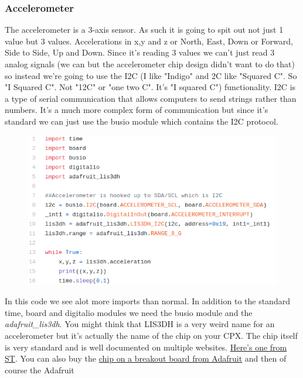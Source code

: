 {\subsubsection{Accelerometer}
\label{s:modules}
The accelerometer is a 3-axis sensor. As such it is going to spit out
not just 1 value but 3 values. Accelerations in x,y and z or North,
East, Down or Forward, Side to Side, Up and Down. Since it’s reading 3
values we can’t just read 3 analog signals (we can but the
accelerometer chip design didn’t want to do that) so instead we’re
going to use the I2C (I like "Indigo" and 2C like "Squared C". So "I Squared C". Not
"12C" or "one two C". It’s "I squared C") functionality. I2C is a type of
serial communication that allows computers to send strings rather than
numbers. It’s a much more complex form of communication but since it’s
standard we can just use the busio module which contains the I2C
protocol. 
\begin{figure}[H]
  \begin{center}
    \includegraphics[width=\textwidth]{Figures/accelerometer_code.png}
  \end{center}
\end{figure}
In this code we see alot more imports than normal. In addition to the
standard time, board and digitalio modules we need the busio module
and the {\it adafruit\_lis3dh}. You might think that LIS3DH is a very
weird name for an accelerometer but it’s actually the name of the chip
on your CPX. The chip itself is very standard and is well documented
on multiple
websites. \href{https://www.st.com/en/mems-and-sensors/lis3dh.html}{Here’s
one from ST}. You can also buy
the \href{https://www.adafruit.com/product/2809?gclid=EAIaIQobChMI98qfjrC86gIVEI_ICh2JtQ-JEAAYAiAAEgJ2_fD_BwE}{chip
on a breakout board from Adafruit} and then of course the Adafruit
}
